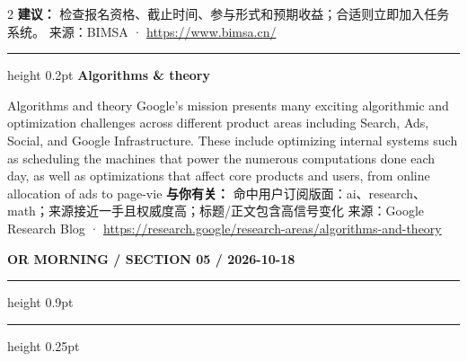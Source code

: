 \documentclass[10.5pt]{ctexart}
\begin{document}
\begin{multicols}{2}
\textbf{建议：} 检查报名资格、截止时间、参与形式和预期收益；合适则立即加入任务系统。
{\footnotesize\color{ormuted} 来源：BIMSA · \url{https://www.bimsa.cn/}}
\vspace{2mm}
\hrule height 0.2pt
\vspace{2mm}
{\large\bfseries Algorithms \& theory}\par
Algorithms and theory Google’s mission presents many exciting algorithmic and optimization challenges across different product areas including Search, Ads, Social, and Google Infrastructure. These include optimizing internal systems such as scheduling the machines that power the numerous computations done each day, as well as optimizations that affect core products and users, from online allocation of ads to page-vie
\textbf{与你有关：} 命中用户订阅版面：ai、research、math；来源接近一手且权威度高；标题/正文包含高信号变化
{\footnotesize\color{ormuted} 来源：Google Research Blog · \url{https://research.google/research-areas/algorithms-and-theory}}
\end{multicols}
\newpage
{\small\bfseries OR MORNING / SECTION 05 / 2026-10-18}
\vspace{2mm}
\hrule height 0.9pt
\vspace{1.5mm}
\hrule height 0.25pt
\vspace{4mm}
\end{document}
